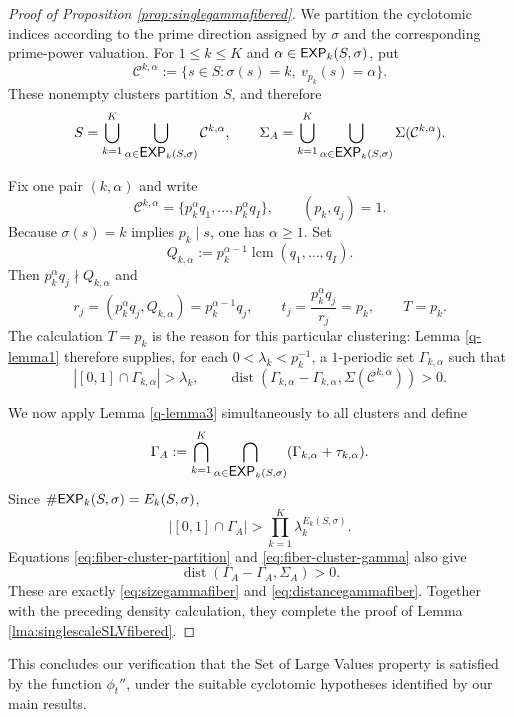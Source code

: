 \documentclass[12pt]{amsart}
\numberwithin{equation}{section}
\newcommand{\capexp}{\hbox{\sf EXP}}
\begin{document}
\begin{proof}[Proof of Proposition \ref{prop:singlegammafibered}]
We partition the cyclotomic indices according to the prime direction assigned by $\sigma$ and the corresponding prime-power valuation.  For $1\leq k\leq K$ and $\alpha\in\capexp_k(S,\sigma)$, put
\[
 \mathcal C^{k,\alpha}
 :=\{s\in S:\sigma(s)=k,\ v_{p_k}(s)=\alpha\}.
\]
These nonempty clusters partition $S$, and therefore
\begin{equation}\label{eq:fiber-cluster-partition}
 S=\bigcup_{k=1}^K\bigcup_{\alpha\in\capexp_k(S,\sigma)}
 \mathcal C^{k,\alpha},
 \qquad
 \Sigma_A=\bigcup_{k=1}^K\bigcup_{\alpha\in\capexp_k(S,\sigma)}
 \Sigma(\mathcal C^{k,\alpha}).
\end{equation}

Fix one pair $(k,\alpha)$ and write
\[
 \mathcal C^{k,\alpha}=\{p_k^\alpha q_1,\ldots,p_k^\alpha q_I\},
 \qquad (p_k,q_j)=1.
\]
Because $\sigma(s)=k$ implies $p_k\mid s$, one has $\alpha\geq1$.  Set
\[
 Q_{k,\alpha}:=p_k^{\alpha-1}\operatorname{lcm}(q_1,\ldots,q_I).
\]
Then $p_k^\alpha q_j\nmid Q_{k,\alpha}$ and
\[
 r_j=(p_k^\alpha q_j,Q_{k,\alpha})=p_k^{\alpha-1}q_j,
 \qquad
 t_j=\frac{p_k^\alpha q_j}{r_j}=p_k,
 \qquad T=p_k.
\]
The calculation $T=p_k$ is the reason for this particular clustering: Lemma \ref{q-lemma1} therefore supplies, for each
$0<\lambda_k<p_k^{-1}$, a $1$-periodic set $\Gamma_{k,\alpha}$ such that
\begin{equation}\label{eq:fiber-cluster-gamma}
 |[0,1]\cap\Gamma_{k,\alpha}|>\lambda_k,
 \qquad
 \operatorname{dist}(\Gamma_{k,\alpha}-\Gamma_{k,\alpha},
 \Sigma(\mathcal C^{k,\alpha}))>0.
\end{equation}

We now apply Lemma \ref{q-lemma3} simultaneously to all clusters and define
\[
 \Gamma_A:=\bigcap_{k=1}^K
 \bigcap_{\alpha\in\capexp_k(S,\sigma)}
 (\Gamma_{k,\alpha}+\tau_{k,\alpha}).
\]
Since $\#\capexp_k(S,\sigma)=E_k(S,\sigma)$,
\[
 |[0,1]\cap\Gamma_A|
 >\prod_{k=1}^K\lambda_k^{E_k(S,\sigma)}.
\]
Equations \eqref{eq:fiber-cluster-partition} and
\eqref{eq:fiber-cluster-gamma} also give
\[
 \operatorname{dist}(\Gamma_A-\Gamma_A,\Sigma_A)>0.
\]
These are exactly \eqref{eq:sizegammafiber} and \eqref{eq:distancegammafiber}.  Together with the preceding density calculation, they complete the proof of Lemma \ref{lma:singlescaleSLVfibered}.
\end{proof}

This concludes our verification that the Set of Large Values property is satisfied by the function $\phi_t''$, under the suitable cyclotomic hypotheses identified by our main results.
\end{document}
